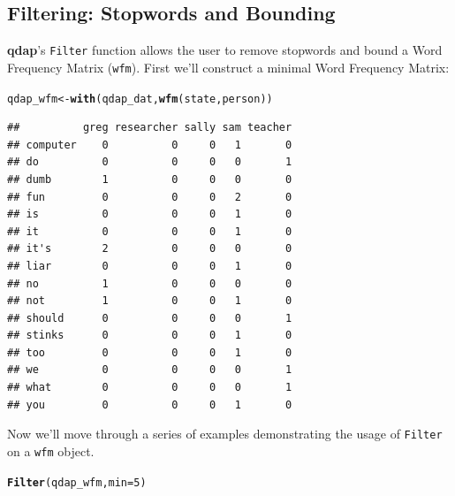 \documentclass{article}\usepackage[]{graphicx}\usepackage[]{color}
\makeatletter
\newcommand{\hlnum}[1]{\textcolor[rgb]{0.686,0.059,0.569}{#1}}%
\newcommand{\hlstd}[1]{\textcolor[rgb]{0.345,0.345,0.345}{#1}}%
\newcommand{\hlkwb}[1]{\textcolor[rgb]{0.69,0.353,0.396}{#1}}%
\newcommand{\hlkwc}[1]{\textcolor[rgb]{0.333,0.667,0.333}{#1}}%
\newcommand{\hlkwd}[1]{\textcolor[rgb]{0.737,0.353,0.396}{\textbf{#1}}}%
\newenvironment{kframe}{%
 \def\at@end@of@kframe{}%
 \ifinner\ifhmode%
  \def\at@end@of@kframe{\end{minipage}}%
  \begin{minipage}{\columnwidth}%
 \fi\fi%
 \def\FrameCommand##1{\hskip\@totalleftmargin \hskip-\fboxsep
 \colorbox{shadecolor}{##1}\hskip-\fboxsep
     \hskip-\linewidth \hskip-\@totalleftmargin \hskip\columnwidth}%
 \MakeFramed {\advance\hsize-\width
   \@totalleftmargin\z@ \linewidth\hsize
   \@setminipage}}%
 {\par\unskip\endMakeFramed%
 \at@end@of@kframe}
\newenvironment{knitrout}{}{} %
\makeatother
\begin{document}
\subsection{Filtering: Stopwords and Bounding}
    

\hspace{.4cm} \textbf{qdap}'s \texttt{Filter} function allows the user to remove stopwords and bound a Word Frequency Matrix (\texttt {wfm}).  First we'll construct a minimal Word Frequency Matrix:

\begin{knitrout}
\color{fgcolor}\begin{kframe}
\begin{alltt}
\hlstd{qdap_wfm} \hlkwb{<-} \hlkwd{with}\hlstd{(qdap_dat,} \hlkwd{wfm}\hlstd{(state, person))}
\end{alltt}
\end{kframe}
\end{knitrout}


\begin{knitrout}
\color{fgcolor}\begin{kframe}
\begin{verbatim}
##          greg researcher sally sam teacher
## computer    0          0     0   1       0
## do          0          0     0   0       1
## dumb        1          0     0   0       0
## fun         0          0     0   2       0
## is          0          0     0   1       0
## it          0          0     0   1       0
## it's        2          0     0   0       0
## liar        0          0     0   1       0
## no          1          0     0   0       0
## not         1          0     0   1       0
## should      0          0     0   0       1
## stinks      0          0     0   1       0
## too         0          0     0   1       0
## we          0          0     0   0       1
## what        0          0     0   0       1
## you         0          0     0   1       0
\end{verbatim}
\end{kframe}
\end{knitrout}


Now we'll move through a series of examples demonstrating the usage of \texttt{Filter} on a \texttt{wfm} object.


\begin{knitrout}
\color{fgcolor}\begin{kframe}
\begin{alltt}
\hlkwd{Filter}\hlstd{(qdap_wfm,} \hlkwc{min} \hlstd{=} \hlnum{5}\hlstd{)}
\end{alltt}
\end{kframe}
\end{knitrout}
\end{document}

